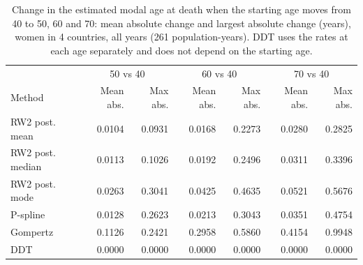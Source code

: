 \begin{table}[htb!]
\centering
\caption{Change in the estimated modal age at death when the starting age moves from 40 to 50, 60 and 70: mean absolute change and largest absolute change (years), women in 4 countries, all years (261 population-years). DDT uses the rates at each age separately and does not depend on the starting age.}
\label{tab:start_age}
\small
\begin{tabular}{lrrrrrr}
\hline
 & \multicolumn{2}{c}{50 vs 40} & \multicolumn{2}{c}{60 vs 40} & \multicolumn{2}{c}{70 vs 40} \\
Method & Mean abs. & Max abs. & Mean abs. & Max abs. & Mean abs. & Max abs. \\
\hline
RW2 post. mean & 0.0104 & 0.0931 & 0.0168 & 0.2273 & 0.0280 & 0.2825 \\
RW2 post. median & 0.0113 & 0.1026 & 0.0192 & 0.2496 & 0.0311 & 0.3396 \\
RW2 post. mode & 0.0263 & 0.3041 & 0.0425 & 0.4635 & 0.0521 & 0.5676 \\
P-spline & 0.0128 & 0.2623 & 0.0213 & 0.3043 & 0.0351 & 0.4754 \\
Gompertz & 0.1126 & 0.2421 & 0.2958 & 0.5860 & 0.4154 & 0.9948 \\
DDT & 0.0000 & 0.0000 & 0.0000 & 0.0000 & 0.0000 & 0.0000 \\
\hline
\end{tabular}
\end{table}

